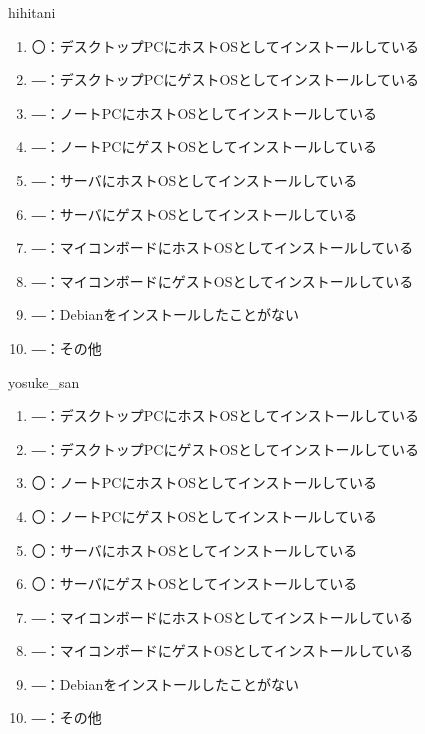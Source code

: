 \begin{prework}{ hihitani }
  \begin{enumerate}
  \item 〇：デスクトップPCにホストOSとしてインストールしている
  \item ―：デスクトップPCにゲストOSとしてインストールしている
  \item ―：ノートPCにホストOSとしてインストールしている
  \item ―：ノートPCにゲストOSとしてインストールしている
  \item ―：サーバにホストOSとしてインストールしている
  \item ―：サーバにゲストOSとしてインストールしている
  \item ―：マイコンボードにホストOSとしてインストールしている
  \item ―：マイコンボードにゲストOSとしてインストールしている
  \item ―：Debianをインストールしたことがない
  \item ―：その他
  \end{enumerate}
\end{prework}

\begin{prework}{ yosuke\_san }
  \begin{enumerate}
  \item ―：デスクトップPCにホストOSとしてインストールしている
  \item ―：デスクトップPCにゲストOSとしてインストールしている
  \item 〇：ノートPCにホストOSとしてインストールしている
  \item 〇：ノートPCにゲストOSとしてインストールしている
  \item 〇：サーバにホストOSとしてインストールしている
  \item 〇：サーバにゲストOSとしてインストールしている
  \item ―：マイコンボードにホストOSとしてインストールしている
  \item ―：マイコンボードにゲストOSとしてインストールしている
  \item ―：Debianをインストールしたことがない
  \item ―：その他
  \end{enumerate}
\end{prework}

